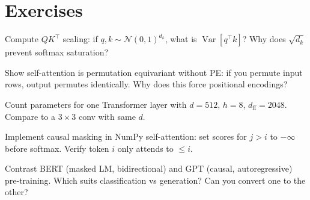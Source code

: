\section{Exercises}
\begin{exercise} Compute $QK^{\top}$ scaling: if $q,k\sim\mathcal{N}(0,1)^{d_k}$, what is $\operatorname{Var}[q^{\top}k]$? Why does $\sqrt{d_k}$ prevent softmax saturation?\end{exercise}
\begin{exercise} Show self-attention is permutation equivariant without PE: if you permute input rows, output permutes identically. Why does this force positional encodings?\end{exercise}
\begin{exercise} Count parameters for one Transformer layer with $d=512$, $h=8$, $d_{\text{ff}}=2048$. Compare to a $3\times3$ conv with same $d$.\end{exercise}
\begin{exercise} Implement causal masking in NumPy self-attention: set scores for $j>i$ to $-\infty$ before softmax. Verify token $i$ only attends to $\le i$.\end{exercise}
\begin{exercise} Contrast BERT (masked LM, bidirectional) and GPT (causal, autoregressive) pre-training. Which suits classification vs generation? Can you convert one to the other?\end{exercise}

